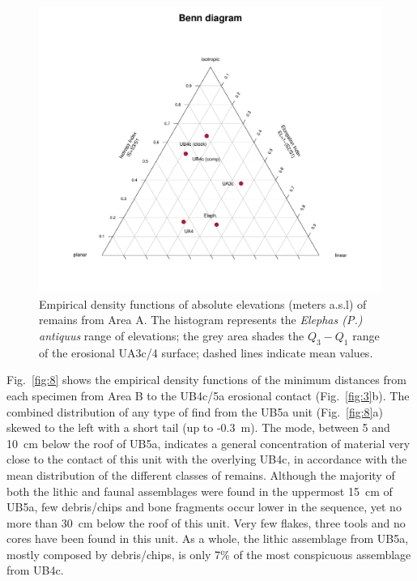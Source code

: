 \documentclass[preprint,authoryear,times]{elsarticle} %
\begin{document}
\begin{figure}[]
  \centering
  \includegraphics[width=1\textwidth]{../artwork/Fig7.pdf}
  \caption{Empirical density functions of absolute elevations (meters a.s.l) of remains from Area A. The histogram represents the \emph{Elephas (P.) antiquus} range of elevations; the grey area shades the $Q_3-Q_1$ range of the erosional UA3c/4 surface; dashed lines indicate mean values.}
  \label{fig:7}
\end{figure}


Fig.~\ref{fig:8} shows the empirical density functions of the minimum distances from each specimen from Area B to the UB4c/5a erosional contact (Fig.~\ref{fig:3}b). The combined distribution of any type of find from the UB5a unit (Fig.~\ref{fig:8}a) skewed to the left with a short tail (up to -0.3~m). The mode, between 5 and 10~cm below the roof of UB5a, indicates a general concentration of material very close to the contact of this unit with the overlying UB4c, in accordance with the mean distribution of the different classes of remains. %
Although the majority of both the lithic and faunal assemblages were found in the uppermost 15~cm of UB5a, few debris/chips and bone fragments occur lower in the sequence, yet no more than 30~cm below the roof of this unit. Very few flakes, three tools and no cores have been found in this unit. As a whole, the lithic assemblage from UB5a, mostly composed by debris/chips, is only 7\% of the most conspicuous assemblage from UB4c.
\end{document}
